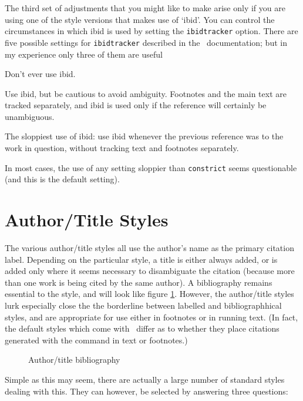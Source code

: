 The third set of adjustments that you might like to make arise only if
you are using one of the style versions that makes use of `ibid'. You
can control the circumstances in which ibid is used by setting the
\verb|ibidtracker| option. There are five possible settings for
\verb|ibidtracker| described in the \biblatex\ documentation; but in
my experience only three of them are useful
\begin{description}[font=\ttfamily\upshape\bfseries]
\item[ibidtracker=false] Don't ever use ibid.
\item[ibidtracker=constrict] Use ibid, but be cautious to avoid
  ambiguity. Footnotes and the main text are tracked separately, and
  ibid is used only if the reference will certainly be unambiguous.
\item[ibidtracker=true] The sloppiest use of ibid: use ibid whenever
  the previous reference was to the work in question, without tracking
  text and footnotes separately.
\end{description}
In most cases, the use of any setting sloppier than \texttt{constrict}
seems questionable (and this is the default setting).




\section{Author/Title Styles}

The various author/title styles all use the author's name as the
primary citation label. Depending on the particular style, a title is
either always added, or is added only where it seems necessary to
disambiguate the citation (because more than one work is being cited
by the same author). A bibliography remains essential to the style,
and will look like figure
\ref{example:bibliography:authortitle}. However, the author/title
styles lurk especially close the the borderline between labelled and
bibliographhical styles, and are appropriate for use either in
footnotes or in running text. (In fact, the default styles which come
with \biblatex\ differ as to whether they place citations generated
with the  command in text or footnotes.)

\begin{figure}
\caption{Author/title bibliography\label{example:bibliography:authortitle}}
\end{figure}

Simple as this may seem, there are actually a large number of standard
styles dealing with this. They can however, be selected by answering
three questions:


